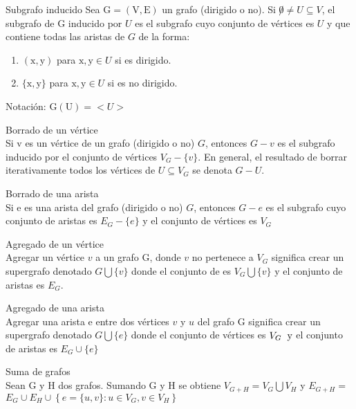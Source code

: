 \documentclass{article}
\begin{document}
\begin{defn}
Subgrafo inducido Sea $\mathrm{G}=(\mathrm{V}, \mathrm{E})$ un grafo (dirigido o no). Si $\not0 \neq U \subseteq V$, el subgrafo de $\mathrm{G}$ inducido por $U$ es el subgrafo cuyo conjunto de vértices es $U$ y que contiene todas las aristas de $G$ de la forma: 
\begin{enumerate}
    \item $(\mathrm{x}, \mathrm{y})$ para $\mathrm{x}, \mathrm{y} \in U$ si es dirigido.
    \item $\{\mathrm{x}, \mathrm{y}\}$ para $\mathrm{x}, \mathrm{y} \in U$ si es no dirigido.
\end{enumerate}
Notación: $\mathrm{G}(\mathrm{U})=<U>$
\end{defn}

\begin{defn}
Borrado de un vértice \\ Si v es un vértice de un grafo (dirigido o no) $G$, entonces $G-v$ es el subgrafo inducido por el conjunto de vértices $V_{G}-\{v\} .$ En general, el resultado de borrar iterativamente todos los vértices de $U \subseteq V_{G}$ se denota $G-U$.
\end{defn}

\begin{defn}
Borrado de una arista \\ Si e es una arista del grafo (dirigido o no) $G$, entonces $G-e$ es el subgrafo cuyo conjunto de aristas es $E_{G}-\{e\}$ y el conjunto de vértices es $V_{G}$
\end{defn}

\begin{defn}
Agregado de un vértice \\ Agregar un vértice $v$ a un grafo $\mathrm{G}$, donde $v$ no pertenece a $V_{G}$ significa crear un supergrafo denotado $G \bigcup\{v\}$ donde el conjunto de es $V_{G} \bigcup\{v\}$ y el conjunto de aristas es $E_{G}$.
\end{defn}

\begin{defn}
Agregado de una arista \\ Agregar una arista e entre dos vértices $v$ y $u$ del grafo $\mathrm{G}$ significa crear un supergrafo denotado $G \bigcup\{e\}$ donde el conjunto de vértices es $V_{G} \hspace{0.2cm} \mathrm{y}$ el conjunto de aristas es $E_{G} \cup\{e\}$
\end{defn}

\begin{defn}
Suma de grafos \\ Sean G y H dos grafos. Sumando $\mathrm{G}$ y $\mathrm{H}$ se obtiene $V_{G+H}=V_{G} \bigcup V_{H}$ y $E_{G+H}=$ $E_{G} \cup E_{H} \cup\left\{e=\{u, v\}: u \in V_{G}, v \in V_{H}\right\}$
\end{defn}
\end{document}
